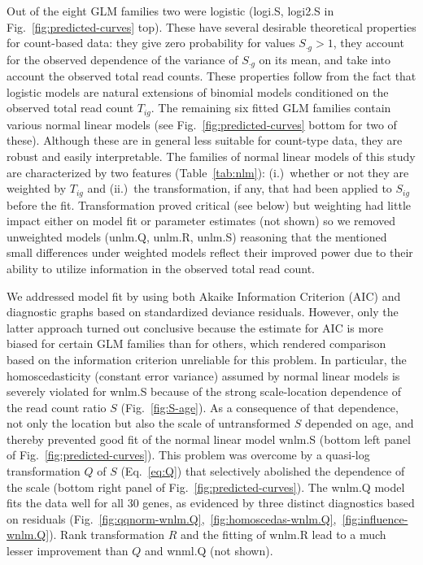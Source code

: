 \documentclass[12pt,letterpaper]{article}
\begin{document}
Out of the eight GLM families two were logistic (logi.S, logi2.S in
Fig.~\ref{fig:predicted-curves} top).  These have several desirable
theoretical properties for count-based data: they give zero probability for
values \(S_{\cdot g}>1\), they account for the observed dependence of the
variance of \(S_{\cdot g}\) on its mean, and take into account the observed
total read counts.  These properties follow from the fact that logistic models
are natural extensions of binomial models conditioned on the observed total
read count \(T_{ig}\).  The remaining six fitted GLM families contain various
normal linear models (see Fig.~\ref{fig:predicted-curves} bottom for two of
these).  Although these are in general less suitable for count-type data, they
are robust and easily interpretable. The families of normal linear models of
this study are characterized by two features (Table~\ref{tab:nlm}):
(i.)~whether or not they are weighted by \(T_{ig}\) and (ii.)~the
transformation, if any, that had been applied to \(S_{ig}\) before the fit.
Transformation proved critical (see below) but weighting had little impact
either on model fit or parameter estimates (not shown) so we removed
unweighted models (unlm.Q, unlm.R, unlm.S) reasoning that the mentioned small
differences under weighted models reflect their improved power due to their
ability to utilize information in the observed total read count.

We addressed model fit by using both Akaike Information Criterion (AIC) and
diagnostic graphs based on standardized deviance residuals.  However, only the
latter approach turned out conclusive because the estimate for AIC is more
biased for certain GLM families than for others, which rendered comparison
based on the information criterion unreliable for this problem.  In
particular, the homoscedasticity (constant error variance) assumed by normal
linear models is severely violated for wnlm.S because of the strong
scale-location dependence of the read count ratio \(S\)
(Fig.~\ref{fig:S-age}).  As a consequence of that dependence, not only
the location but also the scale of untransformed \(S\) depended on age, and
thereby prevented good fit of the normal linear model wnlm.S (bottom left
panel of Fig.~\ref{fig:predicted-curves}).  This problem was overcome by a
quasi-log transformation \(Q\) of \(S\) (Eq.~\ref{eq:Q}) that selectively
abolished the dependence of the scale (bottom right panel of
Fig.~\ref{fig:predicted-curves}).  The wnlm.Q model fits the data well for all
30 genes, as evidenced by three distinct diagnostics based on residuals
(Fig.~\ref{fig:qqnorm-wnlm.Q},~\ref{fig:homoscedas-wnlm.Q},~\ref{fig:influence-wnlm.Q}).
Rank transformation \(R\) and the fitting of wnlm.R lead to a much lesser
improvement than \(Q\) and wnml.Q (not shown).
\end{document}
